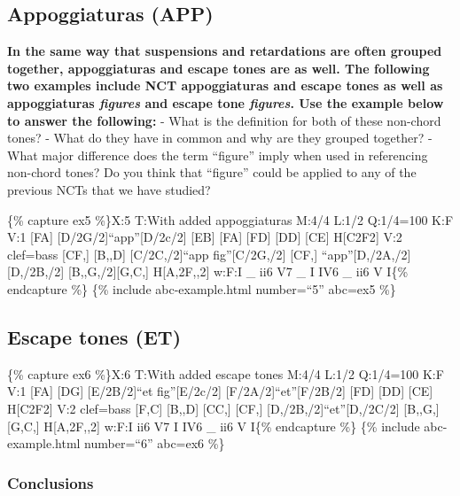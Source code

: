 \documentclass{book}
\begin{document}
\hypertarget{appoggiaturas-app}{%
\subsection{Appoggiaturas (APP)}\label{appoggiaturas-app}}

\textbf{In the same way that suspensions and retardations are often grouped
together, appoggiaturas and escape tones are as well. The following two
examples include NCT appoggiaturas and escape tones as well as appoggiaturas
\emph{figures} and escape tone \emph{figures}. Use the example below to answer
the following:} - What is the definition for both of these non-chord tones? -
What do they have in common and why are they grouped together? - What major
difference does the term ``figure'' imply when used in referencing non-chord
tones? Do you think that ``figure'' could be applied to any of the previous
NCTs that we have studied?

\{\% capture ex5 \%\}X:5 T:With added appoggiaturas M:4/4 L:1/2 Q:1/4=100 K:F
V:1 {[}FA{]}\textbar{} {[}D/2G/2{]}``app''{[}D/2c/2{]} {[}EB{]}\textbar{}
{[}FA{]} {[}FD{]}\textbar{} {[}DD{]} {[}CE{]}\textbar{} H{[}C2F2{]}\textbar{]}
V:2 clef=bass {[}CF,{]}\textbar{} {[}B,,D{]} {[}C/2C,/2{]}``app
fig''{[}C/2G,/2{]}\textbar{} {[}CF,{]}
``app''{[}D,/2A,/2{]}{[}D,/2B,/2{]}\textbar{}
{[}B,,G,/2{]}{[}G,C,{]}\textbar{} H{[}A,2F,,2{]}\textbar{]} w:F:I \_ ii6 V7 \_
I IV6 \_ ii6 V I\{\% endcapture \%\} \{\% include abc-example.html
number=``5'' abc=ex5 \%\}

\hypertarget{escape-tones-et}{%
\subsection{Escape tones (ET)}\label{escape-tones-et}}

\{\% capture ex6 \%\}X:6 T:With added escape tones M:4/4 L:1/2 Q:1/4=100 K:F
V:1 {[}FA{]}\textbar{} {[}DG{]} {[}E/2B/2{]}``et fig''{[}E/2c/2{]}\textbar{}
{[}F/2A/2{]}``et''{[}F/2B/2{]} {[}FD{]}\textbar{} {[}DD{]} {[}CE{]}\textbar{}
H{[}C2F2{]}\textbar{]} V:2 clef=bass {[}F,C{]}\textbar{} {[}B,,D{]}
{[}CC,{]}\textbar{} {[}CF,{]} {[}D,/2B,/2{]}``et''{[}D,/2C/2{]}\textbar{}
{[}B,,G,{]} {[}G,C,{]}\textbar{} H{[}A,2F,,2{]}\textbar{]} w:F:I ii6 V7 I IV6
\_ ii6 V I\{\% endcapture \%\} \{\% include abc-example.html number=``6''
abc=ex6 \%\}

\hypertarget{conclusions-40}{%
\subsubsection{Conclusions}\label{conclusions-40}}
\end{document}
